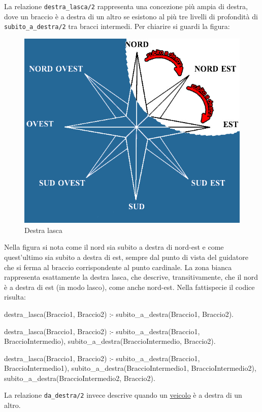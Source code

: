 La relazione \texttt{destra\_lasca/2} rappresenta una concezione più ampia di destra, dove un braccio è a destra di un altro se esistono al più tre livelli di profondità di \texttt{subito\_a\_destra/2} tra bracci intermedi. Per chiarire si guardi la figura:

\begin{figure}[htb]
	\centering
	\includegraphics[width=.8\textwidth]{images/right}
	\caption{Destra lasca}
	\label{fig:right}
\end{figure}

Nella figura si nota come il nord sia subito a destra di nord-est e come quest'ultimo sia subito a destra di est, sempre dal punto di vista del guidatore che si ferma al braccio corrispondente al punto cardinale. La zona bianca rappresenta esattamente la destra lasca, che descrive, transitivamente, che il nord è a destra di est (in modo lasco), come anche nord-est. Nella fattispecie il codice risulta:

\begin{verbatimtab}
destra_lasca(Braccio1, Braccio2) :-
	subito_a_destra(Braccio1, Braccio2).

destra_lasca(Braccio1, Braccio2) :-
	subito_a_destra(Braccio1, BraccioIntermedio),
	subito_a_destra(BraccioIntermedio, Braccio2).

destra_lasca(Braccio1, Braccio2) :-
	subito_a_destra(Braccio1, BraccioIntermedio1),
	subito_a_destra(BraccioIntermedio1, BraccioIntermedio2),
	subito_a_destra(BraccioIntermedio2, Braccio2).
\end{verbatimtab}

La relazione \texttt{da\_destra/2} invece descrive quando un \underline{veicolo} è a destra di un altro.


